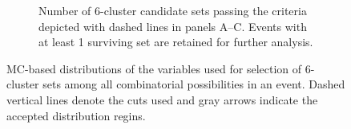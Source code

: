 \begin{figure}[ht!]
\begin{subfigure}{0.45\textwidth}
    \caption{Number of 6-cluster candidate sets passing the criteria depicted with dashed lines in panels A--C. Events with at least 1 surviving set are retained for further analysis.}\label{fig:kl3pi0selection:d}
  \end{subfigure}
  \caption{MC-based distributions of the variables used for selection of 6-cluster sets among all combinatorial possibilities in an event. Dashed vertical lines denote the cuts used and gray arrows indicate the accepted distribution regins.}
  \label{fig:kl3pi0selection}
\end{figure}

